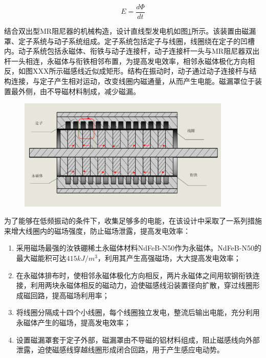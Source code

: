\begin{equation}
\label{magE}
E=\frac{d\Phi}{dt}
\end{equation}

结合双出型MR阻尼器的机械构造，设计直线型发电机如图\ref{powerstation}所示。该装置由磁漏罩、定子系统与动子系统组成。定子系统包括定子与线圈，线圈绕在定子的凹槽内。动子系统包括永磁体、衔铁与动子连接杆，动子连接杆一头与MR阻尼器双出杆一头相连，永磁体与衔铁相邻布置，为提高发电效率，相邻永磁体极化方向相反，如图XXX所示磁感线近似成矩形。结构在振动时，动子通过动子连接杆与结构连接，与定子产生相对运动，改变线圈内磁通量，从而产生电能。磁漏罩位于装置最外侧，由不导磁材料制成，减少磁漏。

\begin{figure}[H]
\centering
{}
\label{powerstation}
\includegraphics[width=4in]{figure/straight}
\end{figure}

为了能够在低频振动的条件下，收集足够多的电能，在该设计中采取了一系列措施来增大线圈内的磁场强度，防止磁场泄露，提高发电效率：

\begin{enumerate}[leftmargin=*,labelindent=16pt,label=\bfseries \arabic*.]
	\item 采用磁场最强的汝铁硼稀土永磁体材料NdFeB-N50作为永磁体。NdFeB-N50的最大磁能积可达$415kJ/m^3$，利用其产生高强磁场，大大提高发电效率；
	\item 在永磁体排布时，使相邻永磁体极化方向相反，两片永磁体之间用软钢衔铁连接，利用两块永磁体相反的磁动力，迫使磁感线沿装置径向扩散，穿过线圈形成磁回路，提高磁场利用率；
	\item 将线圈分隔成十四个小线圈，每个线圈独立发电，整流后输出电能，充分利用永磁体产生的磁场，提高发电效率；
	\item 设置磁漏罩套于定子外部，磁漏罩由不导磁的铝材料组成，阻止磁感线向外部泄露，迫使磁感线穿越线圈形成闭合回路，用于产生感应电动势。
\end{enumerate}

